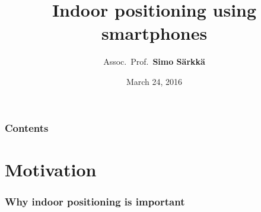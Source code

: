 \documentclass[xcolor=svgnames,english,presentation]{beamer}
\title{Indoor positioning using smartphones}
\author[Simo S\"arkk\"a]{Assoc.~Prof.~{\bf Simo S\"arkk\"a}}
\institute[EEA Department]{\balert{EEA Department / ELEC@Aalto, Finland}} %
\date{March 24, 2016}
\begin{document}

\begin{frame}
  \titlepage
\end{frame}


\begin{frame}
  \frametitle{Contents}
  \tableofcontents[pausesections]
\end{frame}

\section{Motivation}

\begin{frame}
  \frametitle{Why indoor positioning is important}


  \begin{columns}
  \begin{column}{0.7\textwidth}
  \begin{itemize}[<+->]



\end{itemize}
\end{column}
\end{columns}
\end{frame}
\end{document}
